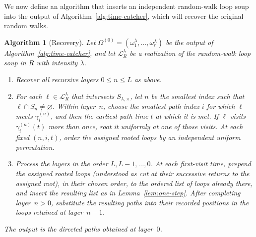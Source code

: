 \documentclass[11pt]{article}
\numberwithin{equation}{section}
\newcommand{\1}{\mathbf{1}}
\newtheorem{algorithm}[theorem]{Algorithm}
\newcommand{\Lc}{\mathcal L}
\begin{document}
We now define an algorithm that inserts an independent random-walk loop soup into the output of Algorithm~\ref{alg:time-catcher}, which will recover the original random walks.

\begin{algorithm}[Recovery]
\label{alg:time-recovery}
Let $\Omega^{(0)}=(\omega_1^\lambda,\ldots,\omega_r^\lambda)$ be the output of
Algorithm~\ref{alg:time-catcher}, and let
$\Lc_R^\lambda$ be a realization of the random-walk loop soup in $R$ with intensity $\lambda$.

\begin{enumerate}[label=\textup{(\arabic*)},leftmargin=2.4em]
\item Recover all recursive layers $0\le n\le L$ as above.

\item For each $\ell\in\Lc_R^\lambda$ that intersects
$S_{\lambda,\times}$, let $n$ be the smallest index such that
$\ell\cap S_n\ne\varnothing$. Within layer~$n$, choose the smallest path index $i$ for
which $\ell$ meets $\gamma_i^{(n)}$, and then the earliest path time $t$ at
which it is met. If $\ell$ visits $\gamma_i^{(n)}(t)$ more than once, root
it uniformly at one of those visits. At each fixed $(n,i,t)$, order the
assigned rooted loops by an independent uniform permutation.

\item Process the layers in the order $L,L-1,\ldots,0$. At each
first-visit time, prepend the assigned rooted loops (understood as cut at their successive returns to the assigned root), in their chosen order,
to the ordered list of loops already there, and insert the resulting list as
in Lemma~\ref{lem:one-step}. After completing layer~$n>0$, substitute the
resulting paths into their recorded positions in the loops retained at
layer~$n-1$.
\end{enumerate}

The output is the directed paths obtained at layer~$0$.
\end{algorithm}
\end{document}
